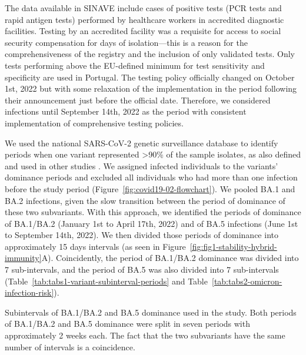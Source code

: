 The data available in SINAVE include cases of positive tests (PCR tests and rapid antigen tests) performed by healthcare workers in accredited diagnostic facilities. Testing by an accredited facility was a requisite for access to social security compensation for days of isolation---this is a reason for the comprehensiveness of the registry and the inclusion of only validated tests. Only tests performing above the EU-defined minimum for test sensitivity and specificity are used in Portugal. The testing policy officially changed on October 1st, 2022 but with some relaxation of the implementation in the period following their announcement just before the official date. Therefore, we considered infections until September 14th, 2022 as the period with consistent implementation of comprehensive testing policies.

We used the national SARS-CoV-2 genetic surveillance database \citep{institutonacionaldesaudedoutorricardojorge2022GeneticDiversity} to identify periods when one variant represented >90\% of the sample isolates, as also defined and used in other studies \citep{malatoRiskBAInfection2022, altarawneh2022ProtectiveEffect}. We assigned infected individuals to the variants' dominance periods and excluded all individuals who had more than one infection before the study period (Figure~\ref{fig:covid19-02-flowchart}). We pooled BA.1 and BA.2 infections, given the slow transition between the period of dominance of these two subvariants. With this approach, we identified the periods of dominance of BA.1/BA.2 (January 1st to April 17th, 2022) and of BA.5 infections (June 1st to September 14th, 2022). We then divided those periods of dominance into approximately 15 days intervals (as seen in Figure~\ref{fig:fig1-stability-hybrid-immunity}A). Coincidently, the period of BA.1/BA.2 dominance was divided into 7 sub-intervals, and the period of BA.5 was also divided into 7 sub-intervals (Table~\ref{tab:tabs1-variant-subinterval-periods} and Table~\ref{tab:tabs2-omicron-infection-risk}).

\begin{table}[h]
    \centering
    \caption[Subintervals of BA.1/BA.2 and BA.5 dominance used in the study]{Subintervals of BA.1/BA.2 and BA.5 dominance used in the study. Both periods of BA.1/BA.2 and BA.5 dominance were split in seven periods with approximately 2 weeks each. The fact that the two subvariants have the same number of intervals is a coincidence.}
    
    \label{tab:tabs1-variant-subinterval-periods}
\end{table}

